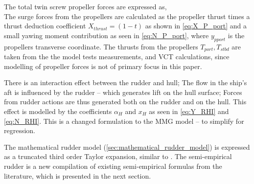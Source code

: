 The total twin screw propeller forces are expressed as,
\begin{equation}
    \label{eq:X_P}
    
\end{equation}
%
\begin{equation}
    \label{eq:Y_P}
    
\end{equation}
%
\begin{equation}
    \label{eq:N_P}
    
\end{equation}
The surge forces from the propellers are calculated as the propeller thrust times a thrust deduction coefficient $X_{thrust}=(1-t)$ as shown in \autoref{eq:X_P_port} and a small yawing moment contribution as seen in \autoref{eq:N_P_port}, where $y_{pport}$ is the propellers transverse coordinate. The thrusts from the propellers $T_{port},T_{stbd}$ are taken from the the model tests measurements, and VCT calculations, since modelling of propeller forces is not of primary focus in this paper.
\begin{equation}
    \label{eq:X_P_port}
    
\end{equation}
\begin{equation}
    \label{eq:N_P_port}
    
\end{equation}

There is an interaction effect between the rudder and hull; The flow in the ship's aft is influenced by the rudder -- which generates lift on the hull surface; Forces from rudder actions are thus generated both on the rudder and on the hull. This effect is modelled by the coefficients $\alpha_H$ and $x_H$ as seen in \autoref{eq:Y_RHI} and \autoref{eq:N_RHI}. This is a changed formulation to the MMG model -- to simplify for regression.
\begin{equation}
    \label{eq:Y_RHI}
    
\end{equation}
%
\begin{equation}
    \label{eq:N_RHI}
    
\end{equation}

The mathematical rudder model (\autoref{sec:mathematical_rudder_model}) is expressed as a truncated third order Taylor expansion, similar to \citet{abkowitz_ship_1964}. 
The semi-empirical rudder is a new compilation of existing semi-empirical formulas from the literature, which is presented in the next section.
